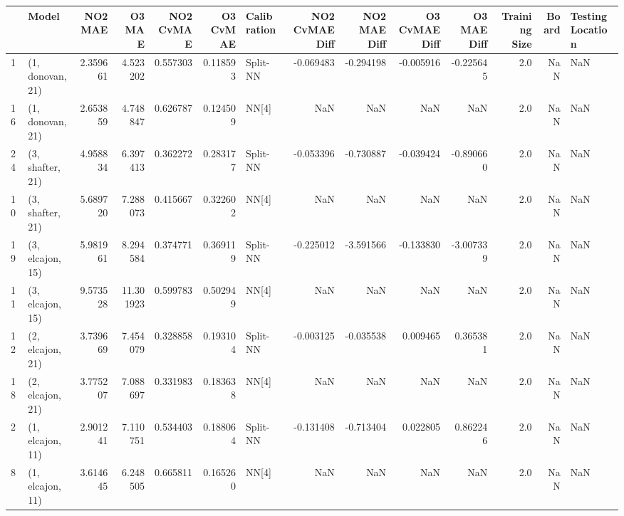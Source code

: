 \begin{tabular}{llrrrrlrrrrrrl}
\toprule
{} &             Model &    NO2 MAE &     O3 MAE &  NO2 CvMAE &  O3 CvMAE & Calibration &  NO2 CvMAE Diff &  NO2 MAE Diff &  O3 CvMAE Diff &  O3 MAE Diff &  Training Size &  Board & Testing Location \\
\midrule
1  &  (1, donovan, 21) &   2.359661 &   4.523202 &   0.557303 &  0.118593 &    Split-NN &       -0.069483 &     -0.294198 &      -0.005916 &    -0.225645 &            2.0 &    NaN &              NaN \\
16 &  (1, donovan, 21) &   2.653859 &   4.748847 &   0.626787 &  0.124509 &       NN[4] &             NaN &           NaN &            NaN &          NaN &            2.0 &    NaN &              NaN \\
24 &  (3, shafter, 21) &   4.958834 &   6.397413 &   0.362272 &  0.283177 &    Split-NN &       -0.053396 &     -0.730887 &      -0.039424 &    -0.890660 &            2.0 &    NaN &              NaN \\
10 &  (3, shafter, 21) &   5.689720 &   7.288073 &   0.415667 &  0.322602 &       NN[4] &             NaN &           NaN &            NaN &          NaN &            2.0 &    NaN &              NaN \\
19 &  (3, elcajon, 15) &   5.981961 &   8.294584 &   0.374771 &  0.369119 &    Split-NN &       -0.225012 &     -3.591566 &      -0.133830 &    -3.007339 &            2.0 &    NaN &              NaN \\
11 &  (3, elcajon, 15) &   9.573528 &  11.301923 &   0.599783 &  0.502949 &       NN[4] &             NaN &           NaN &            NaN &          NaN &            2.0 &    NaN &              NaN \\
12 &  (2, elcajon, 21) &   3.739669 &   7.454079 &   0.328858 &  0.193104 &    Split-NN &       -0.003125 &     -0.035538 &       0.009465 &     0.365381 &            2.0 &    NaN &              NaN \\
18 &  (2, elcajon, 21) &   3.775207 &   7.088697 &   0.331983 &  0.183638 &       NN[4] &             NaN &           NaN &            NaN &          NaN &            2.0 &    NaN &              NaN \\
2  &  (1, elcajon, 11) &   2.901241 &   7.110751 &   0.534403 &  0.188064 &    Split-NN &       -0.131408 &     -0.713404 &       0.022805 &     0.862246 &            2.0 &    NaN &              NaN \\
8  &  (1, elcajon, 11) &   3.614645 &   6.248505 &   0.665811 &  0.165260 &       NN[4] &             NaN &           NaN &            NaN &          NaN &            2.0 &    NaN &              NaN \\

\end{tabular}
